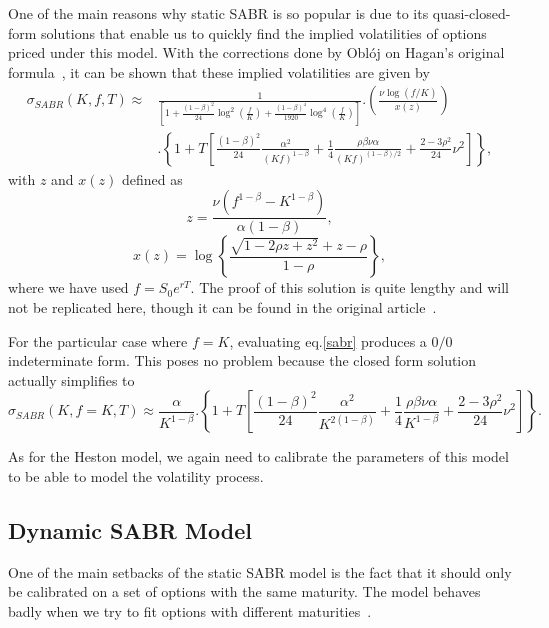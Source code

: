 One of the main reasons why static SABR is so popular is due to its quasi-closed-form solutions that enable us to quickly find the implied volatilities of options priced under this model. With the corrections done by Oblój on Hagan's original formula~\citep{Obloj}, it can be shown that these implied volatilities are given by
\begin{equation}\label{sabr}
\begin{split}
\sigma_{SABR}(K,f,T)\approx&\frac{1}{\displaystyle\left[1+\frac{(1-\beta)^2}{24}\log^2\left(\frac{f}{K}\right)+\frac{(1-\beta)^4}{1920}\log^4\left(\frac{f}{K}\right)\right]}.\left(\frac{\nu\log\left(f/K\right)}{x(z)}\right)\\
&.\left\{1+T\left[\frac{(1-\beta)^2}{24}\frac{\alpha^2}{(Kf)^{1-\beta}}+\frac{1}{4}\frac{\rho\beta\nu\alpha}{(Kf)^{(1-\beta)/2}}+\frac{2-3\rho^2}{24}\nu^2\right]\right\},
\end{split}
\end{equation}
\noindent with $z$ and $x(z)$ defined as
\begin{equation}
z=\frac{\nu\left(f^{1-\beta}-K^{1-\beta}\right)}{\alpha(1-\beta)},
\end{equation}
\begin{equation}
x(z)=\log\left\{\frac{\sqrt{1-2\rho z+z^2}+z-\rho}{1-\rho}\right\},
\end{equation}
\noindent where we have used $f=S_0e^{rT}$. The proof of this solution is quite lengthy and will not be replicated here, though it can be found in the original article~\citep{Hagan}.

For the particular case where $f=K$, evaluating eq.\eqref{sabr} produces a $0/0$ indeterminate form. This poses no problem because the closed form solution actually simplifies to~\citep{Hagan}
\begin{equation}
\sigma_{SABR}(K,f=K,T)\approx\frac{\alpha}{K^{1-\beta}}.\left\{1+T\left[\frac{(1-\beta)^2}{24}\frac{\alpha^2}{K^{2(1-\beta)}}+\frac{1}{4}\frac{\rho\beta\nu\alpha}{K^{1-\beta}}+\frac{2-3\rho^2}{24}\nu^2\right]\right\}.
\end{equation}

As for the Heston model, we again need to calibrate the parameters of this model to be able to model the volatility process.


\subsection{Dynamic SABR Model}
One of the main setbacks of the static SABR model is the fact that it should only be calibrated on a set of options with the same maturity. The model behaves badly when we try to fit options with different maturities~\citep{Hagan}. 

